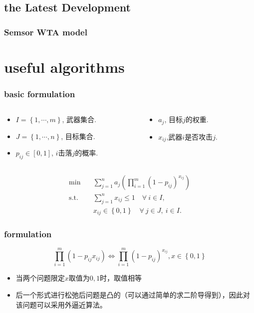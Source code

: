 \documentclass[10pt]{beamer}
\begin{document}
\subsection{the Latest Development}
\begin{frame}
    \frametitle{Semsor WTA model}
\end{frame}

\section{useful algorithms}
\begin{frame}
    \frametitle{basic formulation}
    \begin{columns}
        \begin{column}{.70\linewidth}
            \footnotesize
            \begin{itemize}
                \item $I = \left\{1,\cdots,m\right\} $, 武器集合.
                \item $J = \left\{1,\cdots,n\right\} $, 目标集合.
                \item $p_{ij}\in [0,1]$, $i$击落$j$的概率.
            \end{itemize}
        \end{column}
    \hspace{-1cm}
        \begin{column}{.35\linewidth}
            \footnotesize
            \begin{itemize}
                \item $a_j$, 目标$j$的权重.
                \item $x_{ij}$,武器$i$是否攻击$j$.
            \end{itemize}
        \end{column}
    \end{columns}
    
    \begin{align}
        \min\quad & \sum_{j=1}^n a_j \left( \prod_{i=1}^m (1 -  p_{ij})^{x_{ij}} \right) \\ 
        \mathrm{s. t.}\quad &\sum_{j=1}^n x_{ij} \leq 1\quad \forall ~i \in I,\\
        & x_{ij} \in \left\{ 0,1 \right\} \quad \forall~ j\in J , ~ i \in I.
    \end{align}
\end{frame}

\begin{frame}
    \frametitle{formulation}
    \begin{equation*}
        \prod_{i=1}^{m}{(1-p_{ij}x_{ij})} \iff \prod_{i=1}^{m}{(1-p_{ij})^{x_{ij}}}, x \in \left\{ 0,1 \right\}
    \end{equation*}
    \begin{itemize}
        \item 当两个问题限定$x$取值为$0,1$时，取值相等
        \item 后一个形式进行松弛后问题是凸的（可以通过简单的求二阶导得到），因此对该问题可以采用外逼近算法。
    \end{itemize}
\end{frame}
\end{document}
